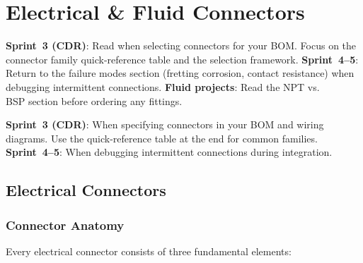 \chapter{Electrical \& Fluid Connectors}\label{ch:connectors}

\begin{tipbox}
\textbf{Sprint~3 (CDR)}: Read when selecting connectors for your BOM. Focus on the connector family quick-reference table and the selection framework. \textbf{Sprint~4--5}: Return to the failure modes section (fretting corrosion, contact resistance) when debugging intermittent connections. \textbf{Fluid projects}: Read the NPT vs.\\ BSP section before ordering any fittings.
\end{tipbox}


\begin{tipbox}
\textbf{Sprint~3 (CDR)}: When specifying connectors in your BOM and wiring diagrams. Use the quick-reference table at the end for common families. \textbf{Sprint~4--5}: When debugging intermittent connections during integration.
\end{tipbox}



\vspace{1em}




\vspace{1em}

\section{Electrical Connectors}

\subsection{Connector Anatomy}

Every electrical connector consists of three fundamental elements:

